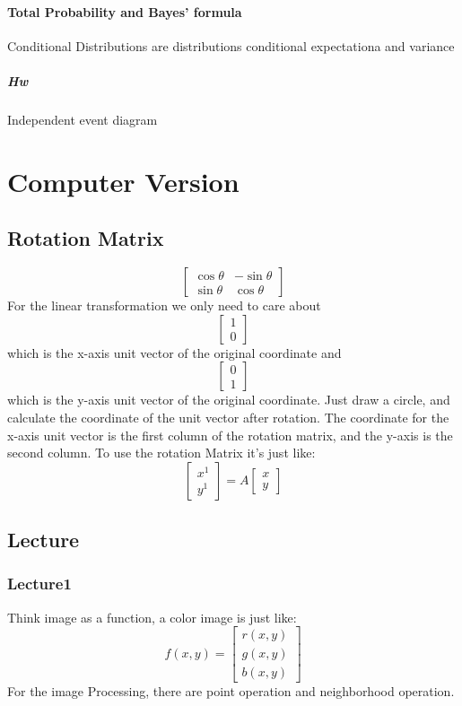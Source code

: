 \documentclass[a4paper]{article}
\begin{document}
\paragraph{Total Probability and Bayes' formula}
Conditional Distributions are distributions
conditional expectationa and variance
\subparagraph{Hw}
Independent event diagram

\section{Computer Version}
\subsection{Rotation Matrix}
$$
\begin{bmatrix}
	{\cos\theta} & {-\sin\theta} \\
	{\sin\theta} & {\cos\theta}
\end{bmatrix}	
$$
For the linear transformation we only need to care about 
$$
\begin{bmatrix}
	1 \\
	0
\end{bmatrix}
$$
which is the x-axis unit vector of the original coordinate and
$$ 
\begin{bmatrix}
	0 \\
	1
\end{bmatrix}
$$
which is the y-axis unit vector of the original coordinate.
Just draw a circle, and calculate the coordinate of the unit vector after rotation. The coordinate for the x-axis unit vector is the first column of the rotation matrix, and the y-axis is the second column.
\bigskip
To use the rotation Matrix it's just like:
$$
\begin{bmatrix}
	x^{1}\\
	y^{1}
\end{bmatrix}
=A
\begin{bmatrix}
	x\\
	y
\end{bmatrix}
$$
\subsection{Lecture}
\subsubsection{Lecture1}
Think image as a function, a color image is just like:
$$
f(x, y)=
\begin{bmatrix}
	r(x,y)\\
	g(x,y)\\
	b(x,y)
\end{bmatrix}
$$
\bigskip
For the image Processing, there are point operation and neighborhood operation.
\end{document}
